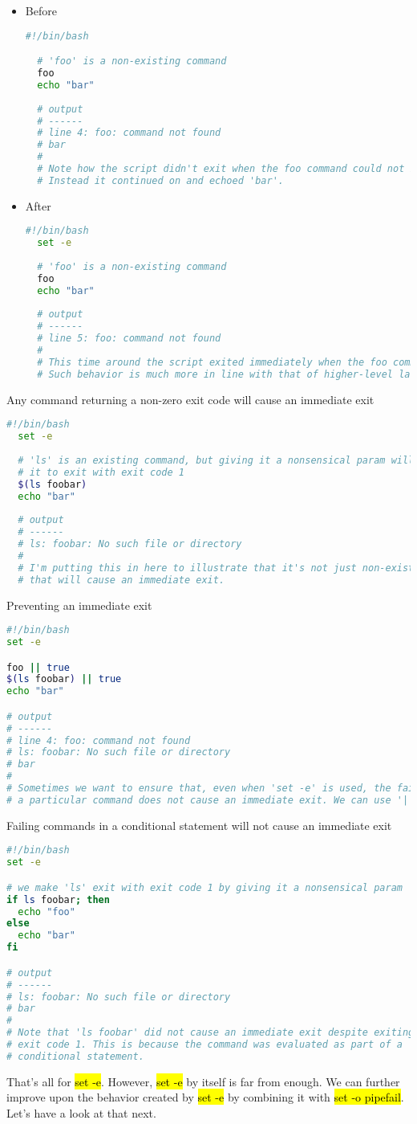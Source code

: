 \documentclass[a4paper]{article}
\begin{document}
\begin{itemize}
 \item Before
  \begin{lstlisting}[language=Bash]
  #!/bin/bash

  # 'foo' is a non-existing command
  foo
  echo "bar"
  
  # output
  # ------
  # line 4: foo: command not found
  # bar
  #
  # Note how the script didn't exit when the foo command could not be found.
  # Instead it continued on and echoed 'bar'.
  \end{lstlisting}
 \item After
  \begin{lstlisting}[language=Bash]
  #!/bin/bash
  set -e
  
  # 'foo' is a non-existing command
  foo
  echo "bar"
  
  # output
  # ------
  # line 5: foo: command not found
  #
  # This time around the script exited immediately when the foo command wasn't found.
  # Such behavior is much more in line with that of higher-level languages. 
  \end{lstlisting}
\end{itemize}
 Any command returning a non-zero exit code will cause an immediate exit
  \begin{lstlisting}[language=Bash]
  #!/bin/bash
  set -e
  
  # 'ls' is an existing command, but giving it a nonsensical param will cause
  # it to exit with exit code 1
  $(ls foobar)
  echo "bar"
  
  # output
  # ------
  # ls: foobar: No such file or directory
  #
  # I'm putting this in here to illustrate that it's not just non-existing commands
  # that will cause an immediate exit.
  \end{lstlisting}
Preventing an immediate exit
  \begin{lstlisting}[language=Bash]
#!/bin/bash
set -e

foo || true
$(ls foobar) || true
echo "bar"

# output
# ------
# line 4: foo: command not found
# ls: foobar: No such file or directory
# bar
#
# Sometimes we want to ensure that, even when 'set -e' is used, the failure of
# a particular command does not cause an immediate exit. We can use '|| true' for this.
  \end{lstlisting}
 Failing commands in a conditional statement will not cause an immediate exit
  \begin{lstlisting}[language=Bash]
#!/bin/bash
set -e

# we make 'ls' exit with exit code 1 by giving it a nonsensical param
if ls foobar; then
  echo "foo"
else
  echo "bar"
fi

# output
# ------
# ls: foobar: No such file or directory
# bar
#
# Note that 'ls foobar' did not cause an immediate exit despite exiting with
# exit code 1. This is because the command was evaluated as part of a
# conditional statement.
  \end{lstlisting}
That’s all for \hl{set -e}. However, \hl{set -e} by itself is far from enough. 
We can further improve upon the behavior created by \hl{set -e} by combining it with \hl{set -o pipefail}.
Let’s have a look at that next.
\end{document}
